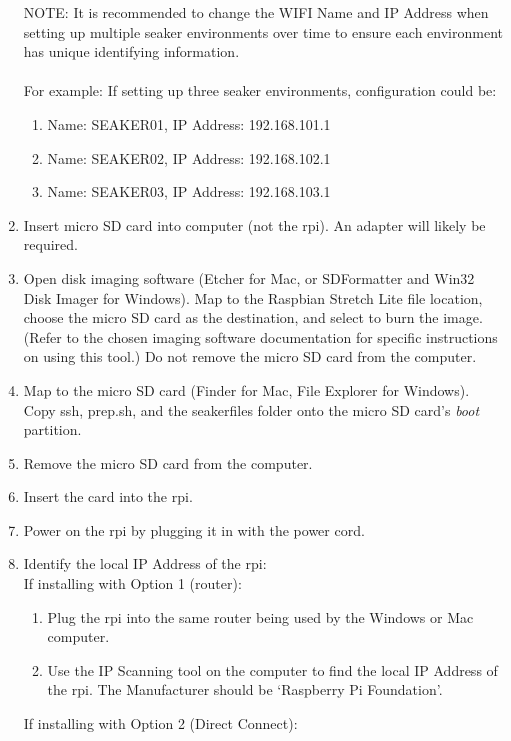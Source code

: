 \documentclass[12pt]{article}
\begin{document}
\begin{enumerate}
  NOTE: It is recommended to change the WIFI Name and IP Address when
  setting up multiple \gls{seaker} environments over time to ensure each
  environment has unique identifying information.\\
  \\
  For example: If setting up three \gls{seaker} environments, configuration could be:
    \begin{enumerate}
      \item Name: SEAKER01, IP Address: 192.168.101.1
      \item Name: SEAKER02, IP Address: 192.168.102.1
      \item Name: SEAKER03, IP Address: 192.168.103.1
    \end{enumerate}
  \item Insert micro SD card into computer (not the \gls{rpi}).
  An adapter will likely be required.
  \item Open disk imaging software (Etcher for Mac, or SDFormatter and 
  Win32 Disk Imager for Windows).
  Map to the Raspbian Stretch Lite file
  location, choose the micro SD card as the destination, and select to burn
  the image. (Refer to the chosen imaging software documentation for
  specific instructions on using this tool.)  Do not remove the micro SD
  card from the computer.
  \item Map to the micro SD card (Finder for Mac, File Explorer for Windows).
  Copy ssh, prep.sh, and the seakerfiles folder onto the micro SD card's
  {\em boot} partition.
  \item Remove the micro SD card from the computer.
  \item Insert the card into the \gls{rpi}.
  \item Power on the \gls{rpi} by plugging it in with the power cord.
  \item Identify the local IP Address of the \gls{rpi}:\\
  If installing with Option 1 (router):
    \begin{enumerate}
      \item Plug the \gls{rpi} into the same router being used by the
      Windows or Mac computer.
      \item Use the IP Scanning tool on the computer to find the local IP
      Address of the \gls{rpi}. The Manufacturer should be ‘Raspberry
      Pi Foundation’.
    \end{enumerate}
  If installing with Option 2 (Direct Connect):
    \begin{enumerate}

\end{enumerate}
\end{enumerate}
\end{document}
